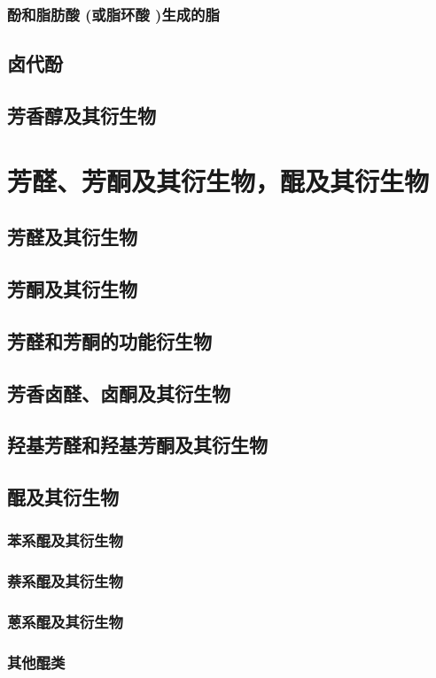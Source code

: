 \documentclass[UTF8]{../03-Chemistry}
\begin{document}
        \subsubsection{酚和脂肪酸 (或脂环酸 )生成的脂}
    \subsection{卤代酚}
    \subsection{芳香醇及其衍生物}
\section{芳醛、芳酮及其衍生物，醌及其衍生物}
    \subsection{芳醛及其衍生物}
    \subsection{芳酮及其衍生物}
    \subsection{芳醛和芳酮的功能衍生物}
    \subsection{芳香卤醛、卤酮及其衍生物}
    \subsection{羟基芳醛和羟基芳酮及其衍生物}
    \subsection{醌及其衍生物}
        \subsubsection{苯系醌及其衍生物}
        \subsubsection{萘系醌及其衍生物}
        \subsubsection{蒽系醌及其衍生物}
        \subsubsection{其他醌类}
\end{document}
